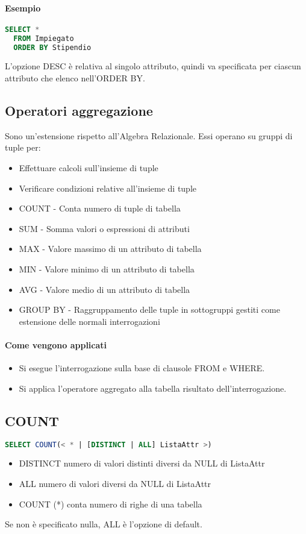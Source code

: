 \paragraph*{Esempio}
\begin{lstlisting}[language=SQL]
  SELECT *
  FROM Impiegato
  ORDER BY Stipendio
\end{lstlisting}
L'opzione DESC è relativa al singolo attributo, quindi va specificata per ciascun attributo
che elenco nell'ORDER BY.\\
\subsection{Operatori aggregazione}
Sono un'estensione rispetto all'Algebra Relazionale. Essi operano su gruppi di tuple per:
\begin{itemize}
  \item Effettuare calcoli sull'insieme di tuple
  \item Verificare condizioni relative all'insieme di tuple
\end{itemize}
\begin{itemize}
  \item COUNT - Conta numero di tuple di tabella
  \item SUM - Somma valori o espressioni di attributi
  \item MAX - Valore massimo di un attributo di tabella
  \item MIN - Valore minimo di un attributo di tabella
  \item AVG - Valore medio di un attributo di tabella
  \item GROUP BY - Raggruppamento delle tuple in sottogruppi gestiti come estensione
  delle normali interrogazioni
\end{itemize}
\paragraph*{Come vengono applicati}
\begin{itemize}
  \item Si esegue l'interrogazione sulla base di clausole FROM e WHERE.
  \item Si applica l'operatore aggregato alla tabella risultato dell'interrogazione.
\end{itemize}
\subsection{COUNT}
\begin{lstlisting}[language=SQL]
  SELECT COUNT(< * | [DISTINCT | ALL] ListaAttr >)
\end{lstlisting}
\begin{itemize}
  \item DISTINCT numero di valori distinti diversi da NULL di ListaAttr
  \item ALL numero di valori diversi da NULL di ListaAttr
  \item COUNT (*) conta numero di righe di una tabella
\end{itemize}
Se non è specificato nulla, ALL è l'opzione di default.
